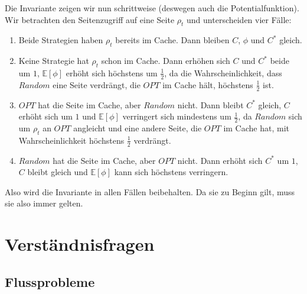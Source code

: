 \documentclass{panikzettel}
\begin{document}
Die Invariante zeigen wir nun schrittweise (deswegen auch die Potentialfunktion). Wir betrachten den Seitenzugriff auf eine Seite $\rho_t$ und unterscheiden vier Fälle:
\begin{enumerate}
    \item Beide Strategien haben $\rho_t$ bereits im Cache. Dann bleiben $C$, $\phi$ und $C^\ast$ gleich.
    \item Keine Strategie hat $\rho_t$ schon im Cache. Dann erhöhen sich $C$ und $C^\ast$ beide um $1$, $\mathbb{E}[\phi]$ erhöht sich höchstens um $\frac{1}{2}$, da die Wahrscheinlichkeit, dass $Random$ eine Seite verdrängt, die $OPT$ im Cache hält, höchstens $\frac{1}{2}$ ist.
    \item $OPT$ hat die Seite im Cache, aber $Random$ nicht. Dann bleibt $C^\ast$ gleich, $C$ erhöht sich um $1$ und $\mathbb{E}[\phi]$ verringert sich mindestens um $\frac{1}{2}$, da $Random$ sich um $\rho_t$ an $OPT$ angleicht und eine andere Seite, die $OPT$ im Cache hat, mit Wahrscheinlichkeit höchstens $\frac{1}{2}$ verdrängt.
    \item $Random$ hat die Seite im Cache, aber $OPT$ nicht. Dann erhöht sich $C^\ast$ um $1$, $C$ bleibt gleich und $\mathbb{E}[\phi]$ kann sich höchstens verringern.
\end{enumerate}
Also wird die Invariante in allen Fällen beibehalten. Da sie zu Beginn gilt, muss sie also immer gelten.

\label{ende}
\newpage
\section{Verständnisfragen}

\subsection*{Flussprobleme}
\end{document}

